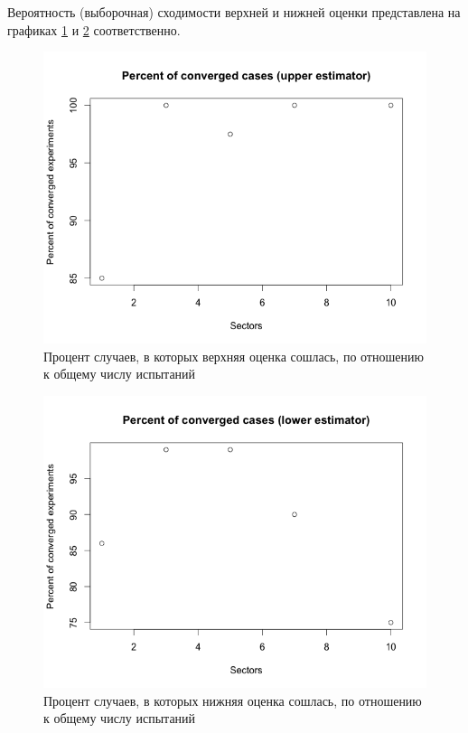 \documentclass[specialist,
               substylefile = spbu.rtx,
               subf,href,colorlinks=true, 12pt]{disser}
\begin{document}
	Вероятность (выборочная) сходимости верхней и нижней оценки представлена на графиках \ref{fig:upperConvergence} и \ref{fig:lowerConvergence} соответственно.
	\begin{figure}[h]
		\includegraphics[width=\textwidth]{upper_convergence}
		\caption{Процент случаев, в которых верхняя оценка сошлась, по отношению к общему числу испытаний}
		\label{fig:upperConvergence}
	\end{figure}
	\begin{figure}[h]
		\includegraphics[width=\textwidth]{lower_convergence}
		\caption{Процент случаев, в которых нижняя оценка сошлась, по отношению к общему числу испытаний}
		\label{fig:lowerConvergence}
	\end{figure}
\end{document}
